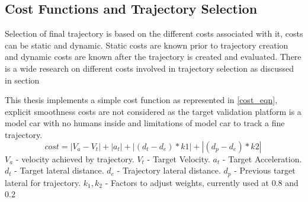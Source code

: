 





\subsection{Cost Functions and Trajectory Selection} \label{traj_Selection}
Selection of final trajectory is based on the different costs associated with it, costs can be static and dynamic. Static costs are known prior to trajectory creation and dynamic costs are known after the trajectory is created and evaluated. There is a wide research on different costs involved in trajectory selection as discussed in section 

This thesis implements a simple cost function as represented in \ref{cost_eqn}, explicit smoothness costs are not considered as the target validation platform is a model car with no humans inside and limitations of model car to track a fine trajectory. 
\begin{equation}
cost = |V_a - V_t| + |a_t| + | (d_t - d_e)*k1 | + | (d_p - d_e)*k2 |\
\label{cost_eqn}
\end{equation}
$V_a$ - velocity achieved by trajectory.
$V_t$ - Target Velocity.
$a_t$ - Target Acceleration.
$d_t$ - Target lateral distance.
$d_e$ - Trajectory lateral distance.
$d_p$ - Previous target lateral for trajectory.
$k_1,k_2$ - Factors to adjust weights, currently used at 0.8 and 0.2

